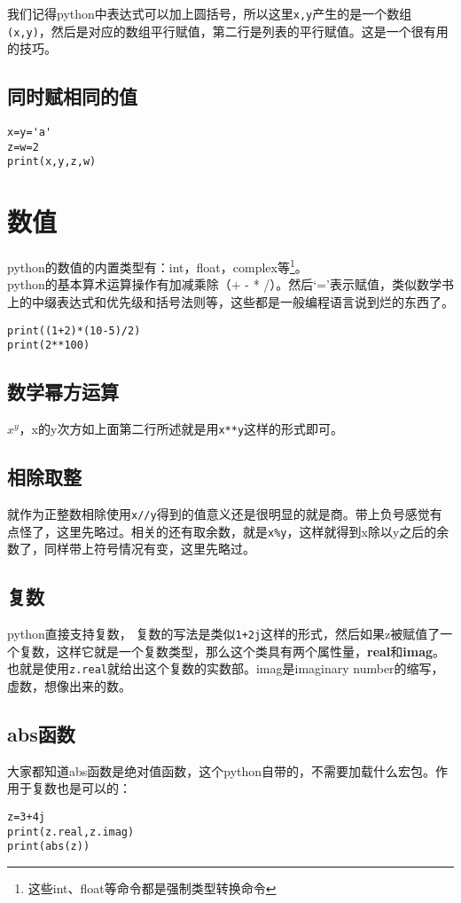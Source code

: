 \documentclass[12pt,oneside]{book}
\begin{document}
\begin{common-format}
我们记得python中表达式可以加上圆括号，所以这里\verb+x,y+产生的是一个数组\verb+(x,y)+，然后是对应的数组平行赋值，第二行是列表的平行赋值。这是一个很有用的技巧。

\subsection{同时赋相同的值}
\begin{Verbatim}
x=y='a'
z=w=2
print(x,y,z,w)
\end{Verbatim}


\section{数值}
python的数值的内置类型有：int，float，complex等\footnote{这些int、float等命令都是强制类型转换命令}。\\python的基本算术运算操作有加减乘除（+ - * /）。然后‘=’表示赋值，类似数学书上的中缀表达式和优先级和括号法则等，这些都是一般编程语言说到烂的东西了。

\begin{Verbatim}
print((1+2)*(10-5)/2)
print(2**100)
\end{Verbatim}


\subsection{数学幂方运算}
$ x^y $，x的y次方如上面第二行所述就是用\verb+x**y+这样的形式即可。

\subsection{相除取整}
就作为正整数相除使用\verb+x//y+得到的值意义还是很明显的就是商。带上负号感觉有点怪了，这里先略过。相关的还有取余数，就是\verb+x%y+，这样就得到x除以y之后的余数了，同样带上符号情况有变，这里先略过。

\subsection{复数}
python直接支持复数， 复数的写法是类似\verb|1+2j|这样的形式，然后如果z被赋值了一个复数，这样它就是一个复数类型，那么这个类具有两个属性量，\textbf{real}和\textbf{imag}。也就是使用\verb+z.real+就给出这个复数的实数部。imag是imaginary number的缩写，虚数，想像出来的数。

\subsection{abs函数}
大家都知道abs函数是绝对值函数，这个python自带的，不需要加载什么宏包。作用于复数也是可以的：
\begin{Verbatim}
z=3+4j
print(z.real,z.imag)
print(abs(z))
\end{Verbatim}


\end{common-format}
\end{document}

